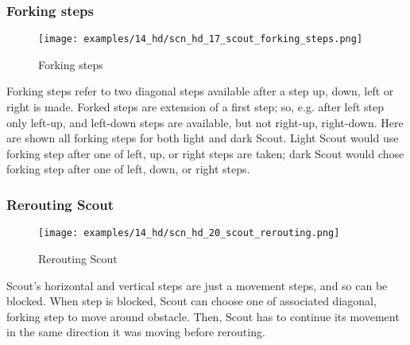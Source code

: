 \vspace*{-0.7\baselineskip}
\subsubsection*{Forking steps}
\label{sec:Hemera's Dawn/Scout/Movement/Forking steps}

\vspace*{-0.7\baselineskip}
\noindent
\begin{wrapfigure}[15]{l}{0.4\textwidth}
\centering
\texttt{[image: examples/14\_hd/scn\_hd\_17\_scout\_forking\_steps.png]}
\vspace*{-0.3\baselineskip}
\caption{Forking steps}
\label{fig:scn_hd_17_scout_forking_steps}
\end{wrapfigure}
Forking steps refer to two diagonal steps available after a step up, down, left
or right is made. \newline
\indent
Forked steps are extension of a first step; so, e.g. after left step only left-up,
and left-down steps are available, but not right-up, right-down. \newline
\indent
Here are shown all forking steps for both light and dark Scout. Light Scout would
use forking step after one of left, up, or right steps are taken; dark Scout would
chose forking step after one of left, down, or right steps.

\clearpage %

\subsubsection*{Rerouting Scout}
\label{sec:Hemera's Dawn/Scout/Movement/Rerouting Scout}

\vspace*{-0.7\baselineskip}
\noindent
\begin{wrapfigure}[9]{l}{0.41\textwidth}
\centering
\texttt{[image: examples/14\_hd/scn\_hd\_20\_scout\_rerouting.png]}
\vspace*{-0.3\baselineskip}
\caption{Rerouting Scout}
\label{fig:scn_hd_20_scout_rerouting}
\end{wrapfigure}
Scout's horizontal and vertical steps are just a movement steps, and so can be blocked.
When step is blocked, Scout can choose one of associated diagonal, forking step to
move around obstacle. Then, Scout has to continue its movement in the same direction
it was moving before rerouting.

